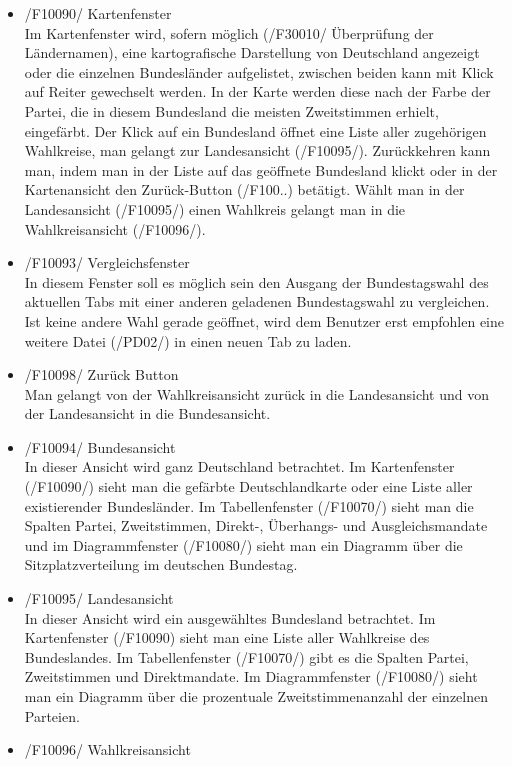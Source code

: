 \documentclass[10pt,a4paper]{article}
\begin{document}
\begin{itemize}
	\item /F10090/ Kartenfenster \hfill \\
	Im Kartenfenster wird, sofern möglich (/F30010/ Überprüfung der Ländernamen), eine kartografische Darstellung von Deutschland angezeigt oder die einzelnen Bundesländer aufgelistet, zwischen beiden kann mit Klick auf Reiter gewechselt werden. In der Karte werden diese nach der Farbe der Partei, die in diesem Bundesland die meisten Zweitstimmen erhielt, eingefärbt. Der Klick auf ein Bundesland öffnet eine Liste aller zugehörigen Wahlkreise, man gelangt zur Landesansicht (/F10095/). Zurückkehren kann man, indem man in der Liste auf das geöffnete Bundesland klickt oder in der Kartenansicht den Zurück-Button (/F100..) betätigt. Wählt man in der Landesansicht (/F10095/) einen Wahlkreis gelangt man in die Wahlkreisansicht (/F10096/). \hfill \\
	\item /F10093/ Vergleichsfenster \hfill \\
	In diesem Fenster soll es möglich sein den Ausgang der Bundestagswahl des aktuellen Tabs mit einer anderen geladenen Bundestagswahl zu vergleichen. Ist keine andere Wahl gerade geöffnet, wird dem Benutzer erst empfohlen eine weitere Datei (/PD02/) in einen neuen Tab zu laden.
	\item /F10098/ Zurück Button\hfill \\
	Man gelangt von der Wahlkreisansicht zurück in die Landesansicht und von der Landesansicht in die Bundesansicht. \hfill \\
	\item /F10094/ Bundesansicht \hfill \\
	In dieser Ansicht wird ganz Deutschland betrachtet. Im Kartenfenster (/F10090/) sieht man die gefärbte Deutschlandkarte oder eine Liste aller existierender Bundesländer. Im Tabellenfenster (/F10070/) sieht man die Spalten Partei, Zweitstimmen, Direkt-, Überhangs- und Ausgleichsmandate und im Diagrammfenster (/F10080/) sieht man ein Diagramm über die Sitzplatzverteilung im deutschen Bundestag.
	\item /F10095/ Landesansicht \hfill \\
	In dieser Ansicht wird ein ausgewähltes Bundesland betrachtet. Im Kartenfenster (/F10090) sieht man eine Liste aller Wahlkreise des Bundeslandes. Im Tabellenfenster (/F10070/) gibt es die Spalten Partei, Zweitstimmen und Direktmandate. Im Diagrammfenster (/F10080/) sieht man ein Diagramm über die prozentuale Zweitstimmenanzahl der einzelnen Parteien.
	\item /F10096/ Wahlkreisansicht \hfill \\

\end{itemize}
\end{document}

